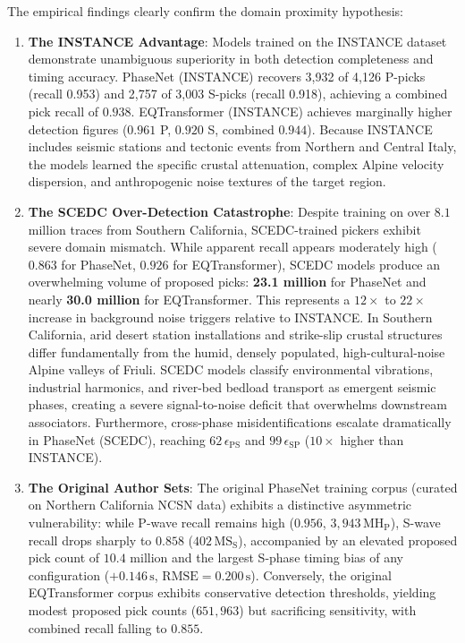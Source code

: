 The empirical findings clearly confirm the domain proximity hypothesis:
\begin{enumerate}
  \item \textbf{The INSTANCE Advantage}: Models trained on the INSTANCE dataset demonstrate unambiguous superiority in both detection completeness and timing accuracy. PhaseNet (INSTANCE) recovers 3,932 of 4,126 P-picks (recall 0.953) and 2,757 of 3,003 S-picks (recall 0.918), achieving a combined pick recall of $0.938$. EQTransformer (INSTANCE) achieves marginally higher detection figures ($0.961$ P, $0.920$ S, combined $0.944$). Because INSTANCE includes seismic stations and tectonic events from Northern and Central Italy, the models learned the specific crustal attenuation, complex Alpine velocity dispersion, and anthropogenic noise textures of the target region.
  \item \textbf{The SCEDC Over-Detection Catastrophe}: Despite training on over $8.1$ million traces from Southern California, SCEDC-trained pickers exhibit severe domain mismatch. While apparent recall appears moderately high ($0.863$ for PhaseNet, $0.926$ for EQTransformer), SCEDC models produce an overwhelming volume of proposed picks: \textbf{23.1 million} for PhaseNet and nearly \textbf{30.0 million} for EQTransformer. This represents a $12\times$ to $22\times$ increase in background noise triggers relative to INSTANCE. In Southern California, arid desert station installations and strike-slip crustal structures differ fundamentally from the humid, densely populated, high-cultural-noise Alpine valleys of Friuli. SCEDC models classify environmental vibrations, industrial harmonics, and river-bed bedload transport as emergent seismic phases, creating a severe signal-to-noise deficit that overwhelms downstream associators. Furthermore, cross-phase misidentifications escalate dramatically in PhaseNet (SCEDC), reaching $62\,\epsilon_{\mathrm{PS}}$ and $99\,\epsilon_{\mathrm{SP}}$ ($10\times$ higher than INSTANCE).
  \item \textbf{The Original Author Sets}: The original PhaseNet training corpus (curated on Northern California NCSN data) exhibits a distinctive asymmetric vulnerability: while P-wave recall remains high ($0.956$, $3{,}943\,\mathrm{MH}_{\mathrm{P}}$), S-wave recall drops sharply to $0.858$ ($402\,\mathrm{MS}_{\mathrm{S}}$), accompanied by an elevated proposed pick count of $10.4$ million and the largest S-phase timing bias of any configuration ($+0.146\,\unit{\second}$, $\mathrm{RMSE} = 0.200\,\unit{\second}$). Conversely, the original EQTransformer corpus exhibits conservative detection thresholds, yielding modest proposed pick counts ($651{,}963$) but sacrificing sensitivity, with combined recall falling to $0.855$.

\end{enumerate}
